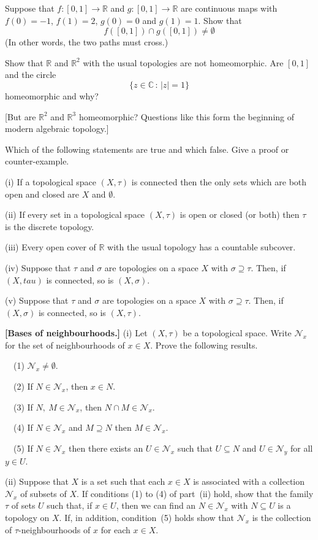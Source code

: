 \begin{problem}\label{E;dimension}
Suppose that $f:[0,1]\rightarrow{\mathbb R}$
and $g:[0,1]\rightarrow{\mathbb R}$
are continuous maps with $f(0)=-1$, $f(1)=2$,
$g(0)=0$ and $g(1)=1$. Show that
\[f([0,1])\cap g([0,1])\neq\emptyset\]
(In other words, the two paths must cross.)

Show that ${\mathbb R}$ and ${\mathbb R}^{2}$
with the usual topologies are not homeomorphic.
Are $[0,1]$ and the circle
\[\{z\in{\mathbb C}\,:\,|z|=1\}\]
homeomorphic and why?

[But are ${\mathbb R}^{2}$ and ${\mathbb R}^{3}$
homeomorphic? Questions like this form the beginning of modern
algebraic topology.]
\end{problem}
\begin{problem} Which of the following statements
are true and which false. Give a proof or counter-example.

(i) If a topological space $(X,\tau)$ is connected
then the only sets which
are both open and closed are $X$ and $\emptyset$.

(ii) If every set in a topological space $(X,\tau)$
is open or closed (or both) then $\tau$ is the discrete
topology.

(iii) Every open cover of ${\mathbb R}$ with the usual topology
has a countable subcover.

(iv) Suppose that $\tau$ and $\sigma$ are topologies
on a space $X$ with $\sigma\supseteq\tau$. Then,
if $(X,tau)$ is connected, so is $(X,\sigma)$.

(v) Suppose that $\tau$ and $\sigma$ are topologies
on a space $X$ with $\sigma\supseteq\tau$. Then,
if $(X,\sigma)$ is connected, so is $(X,\tau)$.
\end{problem}
\begin{problem}{\bf [Bases of neighbourhoods.]}%
\label{E;bases of neighbourhoods}%
(i) Let $(X,\tau)$ be a
topological space.
Write ${\mathcal N}_{x}$ for the set of neighbourhoods
of $x\in X$. Prove the following results.

\ \ (1) ${\mathcal N}_{x}\neq\emptyset$.

\ \ (2) If $N\in {\mathcal N}_{x}$, then $x\in N$.

\ \ (3) If $N,\ M\in {\mathcal N}_{x}$,
then $N\cap M\in{\mathcal N}_{x}$.

\ \ (4) If $N\in{\mathcal N}_{x}$ and $M\supseteq N$
then $M\in{\mathcal N}_{x}$.

\ \ (5) If $N\in{\mathcal N}_{x}$ then there exists
an $U\in{\mathcal N}_{x}$ such that
$U\subseteq N$ and $U\in{\mathcal N}_{y}$ for all
$y\in U$.

(ii) Suppose that $X$ is a set such that each $x\in X$
is associated with a collection ${\mathcal N}_{x}$
of subsets of $X$. If conditions (1) to (4) of
part~(ii) hold, show that the family $\tau$ of sets
$U$ such that, if $x\in U$, then we can
find an $N\in{\mathcal N}_{x}$ with $N\subseteq U$
is a topology on $X$. If, in addition, condition~(5)
holds show that ${\mathcal N}_{x}$ is the collection
of $\tau$-neighbourhoods of $x$ for each $x\in X$.
\end{problem}
